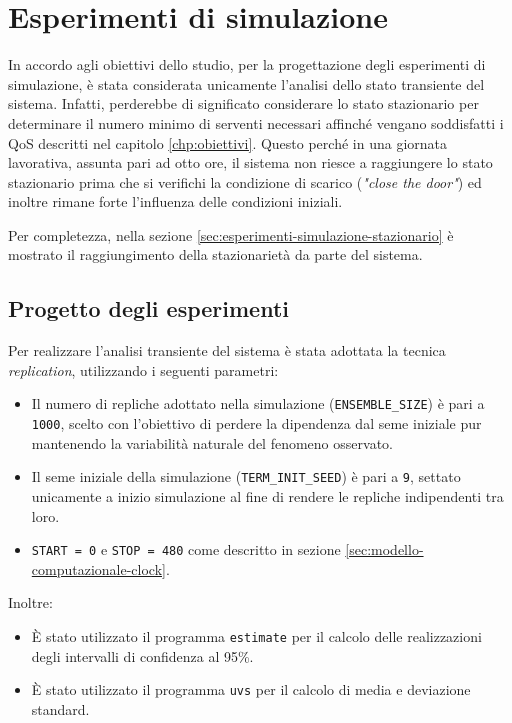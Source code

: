 \chapter{Esperimenti di simulazione}\label{chp:esperimenti-simulazione}
In accordo agli obiettivi dello studio, per la progettazione degli esperimenti di simulazione, è stata considerata unicamente l'analisi dello stato transiente del sistema. Infatti, perderebbe di significato considerare lo stato stazionario per determinare il numero minimo di serventi necessari affinché vengano soddisfatti i QoS descritti nel capitolo \ref{chp:obiettivi}. Questo perché in una giornata lavorativa, assunta pari ad otto ore, il sistema non riesce a raggiungere lo stato stazionario prima che si verifichi la condizione di scarico (\textit{"close the door"}) ed inoltre rimane forte l'influenza delle condizioni iniziali. 

Per completezza, nella sezione \ref{sec:esperimenti-simulazione-stazionario} è mostrato il raggiungimento della stazionarietà da parte del sistema. 

\section{Progetto degli esperimenti}\label{sec:esperimenti-simulazione-1}
Per realizzare l'analisi transiente del sistema è stata adottata la tecnica \textit{replication}, utilizzando i seguenti parametri:
\begin{itemize}
\item Il numero di repliche adottato nella simulazione (\texttt{ENSEMBLE\_SIZE}) è pari a \texttt{1000}, scelto con l'obiettivo di perdere la dipendenza dal seme iniziale pur mantenendo la variabilità naturale del fenomeno osservato.
\item Il seme iniziale della simulazione (\texttt{TERM\_INIT\_SEED}) è pari a \texttt{9}, settato unicamente a inizio simulazione al fine di rendere le repliche indipendenti tra loro.
\item \texttt{START = 0} e \texttt{STOP = 480} come descritto in sezione \ref{sec:modello-computazionale-clock}.
\end{itemize}

Inoltre:
\begin{itemize}
\item È stato utilizzato il programma \texttt{estimate} per il calcolo delle realizzazioni degli intervalli di confidenza al 95\%.
\item È stato utilizzato il programma \texttt{uvs} per il calcolo di media e deviazione standard.
\end{itemize}

